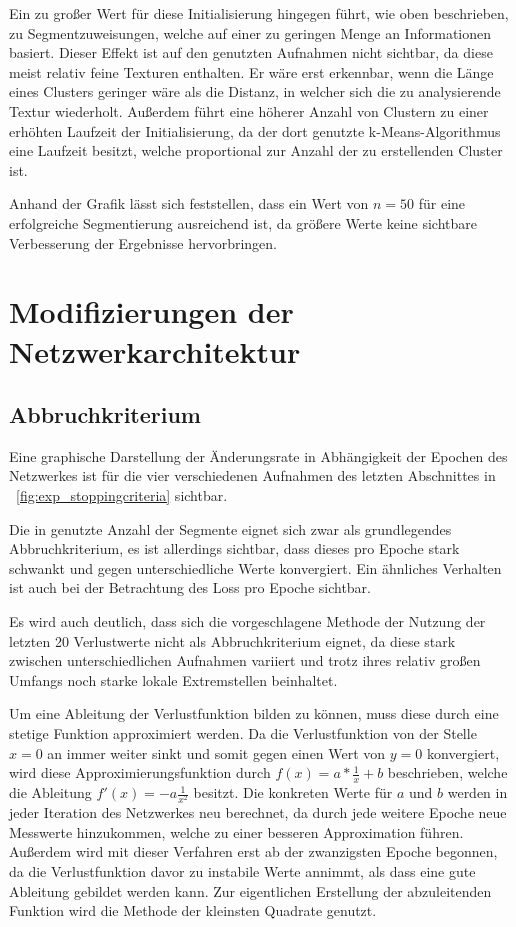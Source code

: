Ein zu großer Wert für diese Initialisierung hingegen führt, wie oben beschrieben, zu Segmentzuweisungen, welche auf einer zu geringen Menge an Informationen basiert. Dieser Effekt ist auf den genutzten Aufnahmen nicht sichtbar, da diese meist relativ feine Texturen enthalten. Er wäre erst erkennbar, wenn die Länge eines Clusters geringer wäre als die Distanz, in welcher sich die zu analysierende Textur wiederholt. Außerdem führt eine höherer Anzahl von Clustern zu einer erhöhten Laufzeit der Initialisierung, da der dort genutzte k-Means-Algorithmus eine Laufzeit besitzt, welche proportional zur Anzahl der zu erstellenden Cluster ist.

Anhand der Grafik lässt sich feststellen, dass ein Wert von $n=50$ für eine erfolgreiche Segmentierung ausreichend ist, da größere Werte keine sichtbare Verbesserung der Ergebnisse hervorbringen.

\section{Modifizierungen der Netzwerkarchitektur}

\subsection{Abbruchkriterium}
\label{ssec:exp_stoppingcriteria}

Eine graphische Darstellung der Änderungsrate in Abhängigkeit der Epochen des Netzwerkes ist für die vier verschiedenen Aufnahmen des letzten Abschnittes in \figurename~\ref{fig:exp_stoppingcriteria} sichtbar.

Die in \cite{kanezaki_18} genutzte Anzahl der Segmente eignet sich zwar als grundlegendes Abbruchkriterium, es ist allerdings sichtbar, dass dieses pro Epoche stark schwankt und gegen unterschiedliche Werte konvergiert. Ein ähnliches Verhalten ist auch bei der Betrachtung des Loss pro Epoche sichtbar.

Es wird auch deutlich, dass sich die vorgeschlagene Methode der Nutzung der letzten 20 Verlustwerte nicht als Abbruchkriterium eignet, da diese stark zwischen unterschiedlichen Aufnahmen variiert und trotz ihres relativ großen Umfangs noch starke lokale Extremstellen beinhaltet.

Um eine Ableitung der Verlustfunktion bilden zu können, muss diese durch eine stetige Funktion approximiert werden. Da die Verlustfunktion von der Stelle $x=0$ an immer weiter sinkt und somit gegen einen Wert von $y=0$ konvergiert, wird diese Approximierungsfunktion durch $f(x) = a*\frac{1}{x}+b$ beschrieben, welche die Ableitung $f'(x)=-a\frac{1}{x^2}$ besitzt. Die konkreten Werte für $a$ und $b$ werden in jeder Iteration des Netzwerkes neu berechnet, da durch jede weitere Epoche neue Messwerte hinzukommen, welche zu einer besseren Approximation führen. Außerdem wird mit dieser Verfahren erst ab der zwanzigsten Epoche begonnen, da die Verlustfunktion davor zu instabile Werte annimmt, als dass eine gute Ableitung gebildet werden kann. Zur eigentlichen Erstellung der abzuleitenden Funktion wird die Methode der kleinsten Quadrate genutzt.

